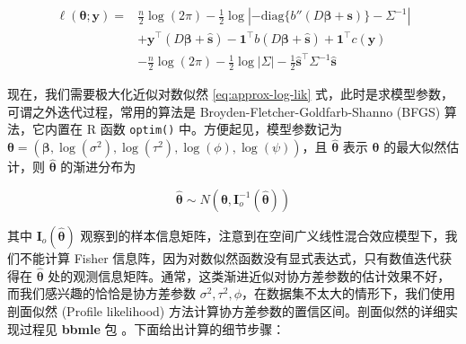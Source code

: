 \documentclass[12pt,a4paper,UTF8,twoside]{book}
\theoremstyle{definition}
\theoremstyle{definition}
\theoremstyle{definition}
\theoremstyle{remark}
\begin{document}
\begin{equation}
\begin{aligned}
\ell(\boldsymbol{\theta};\mathbf{y}) = {} & \frac{n}{2}\log (2\pi) -\frac{1}{2}\log | -\mathrm{diag} \{b''(D\boldsymbol{\beta} + \mathbf{s}) \} - \Sigma^{-1} |  \\
& + \mathbf{y}^{\top} (D\boldsymbol{\beta} + \hat{\mathbf{s}}) - \mathbf{1}^{\top} b( D\boldsymbol{\beta} + \hat{\mathbf{s}}) + \mathbf{1}^{\top} c(\mathbf{y}) \\
& - \frac{n}{2}\log (2\pi) -\frac{1}{2}\log |\Sigma| -\frac{1}{2}\hat{\mathbf{s}}^{\top} \Sigma^{-1} \hat{\mathbf{s}}
\end{aligned} \label{eq:approx-log-lik}
\end{equation}

现在，我们需要极大化近似对数似然 \eqref{eq:approx-log-lik}
式，此时是求模型参数，可谓之外迭代过程，常用的算法是
Broyden-Fletcher-Goldfarb-Shanno (BFGS) 算法，它内置在 R 函数
\texttt{optim()} 中。方便起见，模型参数记为
\(\boldsymbol{\theta} = (\boldsymbol{\beta},\log(\sigma^2),\log(\tau^2),\log(\phi),\log(\psi))\)，且
\(\hat{\boldsymbol{\theta}}\) 表示 \(\boldsymbol{\theta}\)
的最大似然估计，则 \(\hat{\boldsymbol{\theta}}\) 的渐进分布为

\[
\hat{\boldsymbol{\theta}} \sim N(\boldsymbol{\theta}, \mathbf{I}_{o}^{-1}(\hat{\boldsymbol{\theta}}))
\]

其中 \(\mathbf{I}_{o}(\hat{\boldsymbol{\theta}})\)
观察到的样本信息矩阵，注意到在空间广义线性混合效应模型下，我们不能计算
Fisher 信息阵，因为对数似然函数没有显式表达式，只有数值迭代获得在
\(\hat{\boldsymbol{\theta}}\)
处的观测信息矩阵。通常，这类渐进近似对协方差参数的估计效果不好，而我们感兴趣的恰恰是协方差参数
\(\sigma^2,\tau^2,\phi\)，在数据集不太大的情形下，我们使用剖面似然
(Profile likelihood)
方法计算协方差参数的置信区间。剖面似然的详细实现过程见 \textbf{bbmle} 包
\citep{R-bbmle}。下面给出计算的细节步骤：
\end{document}
